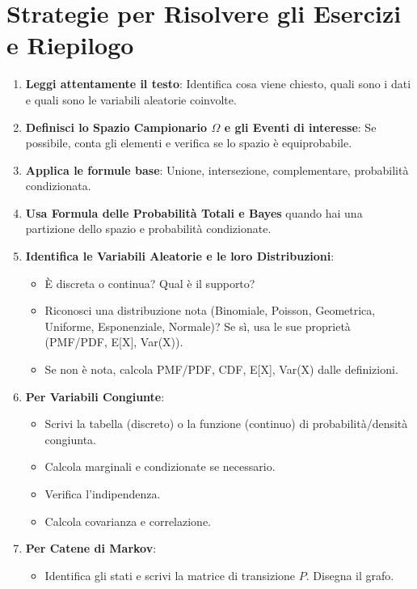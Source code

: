 \chapter{Strategie per Risolvere gli Esercizi e Riepilogo}
\begin{enumerate}
    \item \textbf{Leggi attentamente il testo}: Identifica cosa viene chiesto, quali sono i dati e quali sono le variabili aleatorie coinvolte.
    \item \textbf{Definisci lo Spazio Campionario $\Omega$ e gli Eventi di interesse}: Se possibile, conta gli elementi e verifica se lo spazio è equiprobabile.
    \item \textbf{Applica le formule base}: Unione, intersezione, complementare, probabilità condizionata.
    \item \textbf{Usa Formula delle Probabilità Totali e Bayes} quando hai una partizione dello spazio e probabilità condizionate.
    \item \textbf{Identifica le Variabili Aleatorie e le loro Distribuzioni}:
        \begin{itemize}
            \item È discreta o continua? Qual è il supporto?
            \item Riconosci una distribuzione nota (Binomiale, Poisson, Geometrica, Uniforme, Esponenziale, Normale)? Se sì, usa le sue proprietà (PMF/PDF, E[X], Var(X)).
            \item Se non è nota, calcola PMF/PDF, CDF, E[X], Var(X) dalle definizioni.
        \end{itemize}
    \item \textbf{Per Variabili Congiunte}:
        \begin{itemize}
            \item Scrivi la tabella (discreto) o la funzione (continuo) di probabilità/densità congiunta.
            \item Calcola marginali e condizionate se necessario.
            \item Verifica l'indipendenza.
            \item Calcola covarianza e correlazione.
        \end{itemize}
    \item \textbf{Per Catene di Markov}:
        \begin{itemize}
            \item Identifica gli stati e scrivi la matrice di transizione $P$. Disegna il grafo.

\end{itemize}
\end{enumerate}
